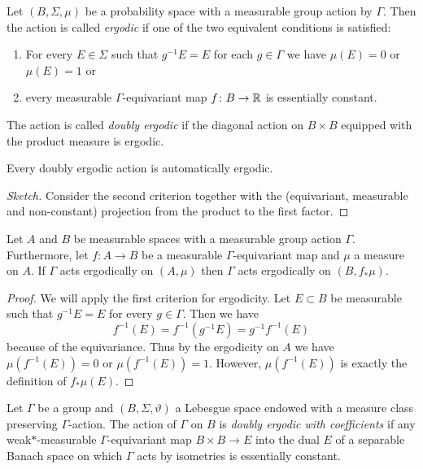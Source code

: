 \begin{defin}
  Let \((B, \Sigma, \mu)\) be a probability space with a measurable group action by \(\Gamma\). Then the action is called \emph{ergodic} if one of the two equivalent conditions is satisfied:
  \begin{enumerate}
  \item For every \(E \in \Sigma\) such that \(g^{-1}E = E\) for each \(g \in \Gamma\) we have \(\mu(E) = 0\) or \(\mu(E) = 1\) or
  \item every measurable \(\Gamma\)-equivariant map \(f\colon B \to \mathbb{R}\) is essentially constant.
  \end{enumerate}
  The action is called \emph{doubly ergodic} if the diagonal action on \(B \times B\) equipped with the product measure is ergodic.
\end{defin}

\begin{prop}
  \label{prop:coeff-ergodic}
  Every doubly ergodic action is automatically ergodic.
\end{prop}

\begin{proof}[Sketch]
  Consider the second criterion together with the (equivariant, measurable and non-constant) projection from the product to the first factor.
\end{proof}

\begin{lemma}
  \label{lemma:ergodicity-pushforward}
  Let \(A\) and \(B\) be measurable spaces with a measurable group action \(\Gamma\). Furthermore, let \(f\colon A \to B\) be a measurable \(\Gamma\)-equivariant map and \(\mu\) a measure on \(A\). If \(\Gamma\) acts ergodically on \((A, \mu)\) then \(\Gamma\) acts ergodically on \((B, f_\ast \mu)\).
\end{lemma}

\begin{proof}
  We will apply the first criterion for ergodicity. Let \(E \subset B\) be measurable such that \(g^{-1} E = E\) for every \(g \in \Gamma\). Then we have
  \[
    f^{-1}(E) = f^{-1}(g^{-1}E) = g^{-1}f^{-1}(E)
  \]
  because of the equivariance. Thus by the ergodicity on \(A\) we have \(\mu(f^{-1}(E))= 0\) or \(\mu(f^{-1}(E)) = 1\). However, \(\mu(f^{-1}(E))\) is exactly the definition of \(f_\ast\mu(E)\).
\end{proof}

\begin{defin}
  Let \(\Gamma\) be a group and \((B, \Sigma, \vartheta)\) a Lebesgue space endowed with a measure class preserving \(\Gamma\)-action. The action of \(\Gamma\) on \(B\) is \emph{doubly ergodic with coefficients} if any weak\(\ast\)-measurable \(\Gamma\)-equivariant map \(B \times B \to E\) into the dual \(E\) of a separable Banach space on which \(\Gamma\) acts by isometries is essentially constant.
\end{defin}

